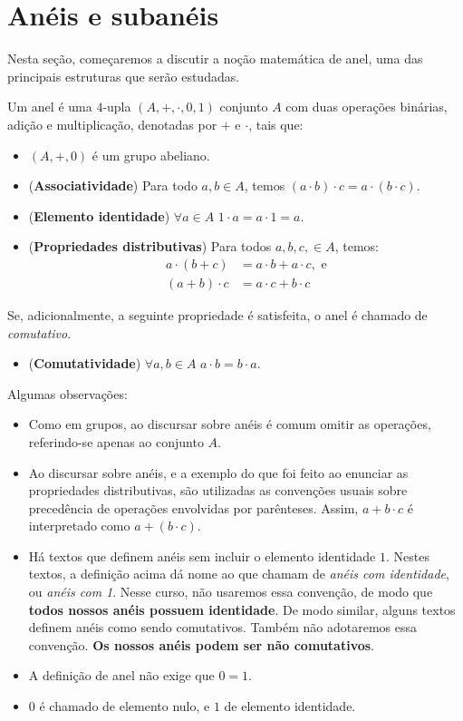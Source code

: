 
\chapter{Anéis e subanéis}
Nesta seção, começaremos a discutir a noção matemática de anel, uma das principais estruturas que serão estudadas.
\begin{definition}[Anel]
    Um anel é uma $4$-upla $(A, +, \cdot, 0, 1)$ conjunto $A$ com duas operações binárias, adição e multiplicação, denotadas por $+$ e $\cdot$, tais que:
    \begin{itemize}
        \item $(A, +, 0)$ é um grupo abeliano.
        \item (\textbf{Associatividade}) Para todo $a, b \in A$, temos $(a \cdot b)\cdot c = a\cdot(b\cdot c)$.
        \item (\textbf{Elemento identidade}) $\forall a \in A$ $1 \cdot a = a \cdot 1 = a$.
        \item (\textbf{Propriedades distributivas}) Para todos $a, b, c, \in A$, temos:
        \begin{align*}
            a \cdot (b + c) &= a \cdot b + a \cdot c, \text{ e}\\
            (a + b) \cdot c &= a \cdot c + b \cdot c
        \end{align*}
    \end{itemize}
    Se, adicionalmente, a seguinte propriedade é satisfeita, o anel é chamado de \emph{comutativo}.
    \begin{itemize}
        \item (\textbf{Comutatividade}) $\forall a, b \in A$ $a \cdot b = b \cdot a$.
    \end{itemize}
\end{definition}

Algumas observações:
\begin{itemize}
    \item Como em grupos, ao discursar sobre anéis é comum omitir as operações, referindo-se apenas ao conjunto $A$.
    \item Ao discursar sobre anéis, e a exemplo do que foi feito ao enunciar as propriedades distributivas, são utilizadas as convenções usuais sobre precedência de operações envolvidas por parênteses.
    Assim, $a + b \cdot c$ é interpretado como $a + (b \cdot c)$.
    \item Há textos que definem anéis sem incluir o elemento identidade $1$.
    Nestes textos, a definição acima dá nome ao que chamam de \emph{anéis com identidade}, ou \emph{anéis com 1}.
    Nesse curso, não usaremos essa convenção, de modo que \textbf{todos nossos anéis possuem identidade}.
    De modo similar, alguns textos definem anéis como sendo comutativos. Também não adotaremos essa convenção.
    \textbf{Os nossos anéis podem ser não comutativos}.
    \item A definição de anel não exige que $0=1$.
    \item $0$ é chamado de elemento nulo, e $1$ de elemento identidade.
\end{itemize}


